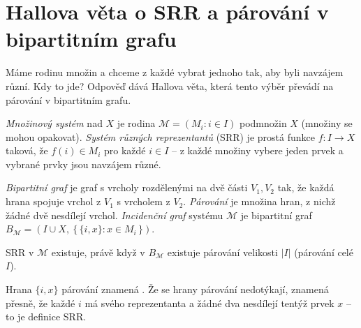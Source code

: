 \documentclass[11pt,a4paper]{article}
\newcommand{\Mcal}{\mathcal{M}}
\begin{document}
\section{Hallova věta o SRR a párování v bipartitním grafu}

Máme rodinu množin a chceme z každé vybrat jednoho  tak, aby byli navzájem různí. Kdy to jde? Odpověď dává Hallova věta, která tento výběr převádí na párování v bipartitním grafu.

\begin{definice}
\emph{Množinový systém} nad $X$ je rodina $\Mcal=(M_i:i\in I)$ podmnožin $X$ (množiny se mohou opakovat). \emph{Systém různých reprezentantů} (SRR) je prostá funkce $f\colon I\to X$ taková, že $f(i)\in M_i$ pro každé $i\in I$ -- z každé množiny vybere jeden prvek a vybrané prvky jsou navzájem různé.
\end{definice}

\begin{definice}
\emph{Bipartitní graf} je graf s vrcholy rozdělenými na dvě části $V_1,V_2$ tak, že každá hrana spojuje vrchol z $V_1$ s vrcholem z $V_2$. \emph{Párování} je množina hran, z nichž žádné dvě nesdílejí vrchol. \emph{Incidenční graf} systému $\Mcal$ je bipartitní graf $B_{\Mcal}=(I\cup X,\ \{\,\{i,x\}:x\in M_i\,\})$.
\end{definice}

\begin{lemma}
SRR v $\Mcal$ existuje, právě když v $B_{\Mcal}$ existuje párování velikosti $|I|$ (párování  celé $I$).
\end{lemma}

\begin{intuice}
Hrana $\{i,x\}$ párování znamená . Že se hrany párování nedotýkají, znamená přesně, že každé $i$ má svého reprezentanta a žádné dva nesdílejí tentýž prvek $x$ -- to je definice SRR.
\end{intuice}

\begin{center}
\end{center}
\end{document}
